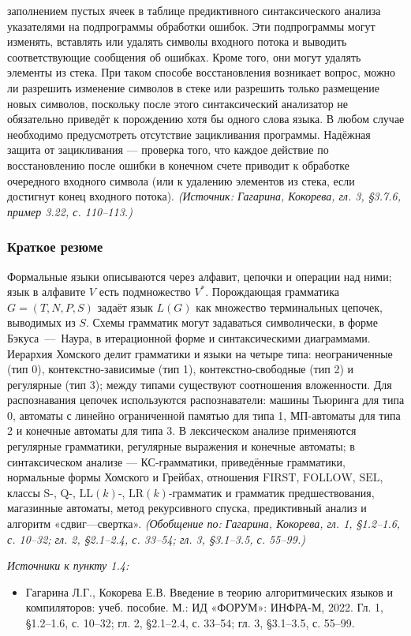 \documentclass[a4paper,12pt]{article}
\begin{document}
заполнением пустых ячеек в таблице предиктивного синтаксического анализа указателями на подпрограммы обработки ошибок. Эти подпрограммы могут изменять, вставлять или удалять символы входного потока и выводить соответствующие сообщения об ошибках. Кроме того, они могут удалять элементы из стека. При таком способе восстановления возникает вопрос, можно ли разрешить изменение символов в стеке или разрешить только размещение новых символов, поскольку после этого синтаксический анализатор не обязательно приведёт к порождению хотя бы одного слова языка. В любом случае необходимо предусмотреть отсутствие зацикливания программы. Надёжная защита от зацикливания — проверка того, что каждое действие по восстановлению после ошибки в конечном счете приводит к обработке очередного входного символа (или к удалению элементов из стека, если достигнут конец входного потока).
\textit{(Источник: Гагарина, Кокорева, гл. 3, §3.7.6, пример 3.22, с. 110--113.)}

\subsubsection{Краткое резюме}

Формальные языки описываются через алфавит, цепочки и операции над ними; язык в алфавите \(V\) есть подмножество \(V^*\). Порождающая грамматика \(G=(T,N,P,S)\) задаёт язык \(L(G)\) как множество терминальных цепочек, выводимых из \(S\). Схемы грамматик могут задаваться символически, в форме Бэкуса~—~Наура, в итерационной форме и синтаксическими диаграммами. Иерархия Хомского делит грамматики и языки на четыре типа: неограниченные (тип 0), контекстно-зависимые (тип 1), контекстно-свободные (тип 2) и регулярные (тип 3); между типами существуют соотношения вложенности. Для распознавания цепочек используются распознаватели: машины Тьюринга для типа 0, автоматы с линейно ограниченной памятью для типа 1, МП-автоматы для типа 2 и конечные автоматы для типа 3. В лексическом анализе применяются регулярные грамматики, регулярные выражения и конечные автоматы; в синтаксическом анализе — КС-грамматики, приведённые грамматики, нормальные формы Хомского и Грейбах, отношения \(\mathrm{FIRST}\), \(\mathrm{FOLLOW}\), \(\mathrm{SEL}\), классы S-, Q-, \(\mathrm{LL}(k)\)-, \(\mathrm{LR}(k)\)-грамматик и грамматик предшествования, магазинные автоматы, метод рекурсивного спуска, предиктивный анализ и алгоритм «сдвиг—свертка».
\textit{(Обобщение по: Гагарина, Кокорева, гл. 1, §1.2--1.6, с. 10--32; гл. 2, §2.1--2.4, с. 33--54; гл. 3, §3.1--3.5, с. 55--99.)}

\noindent\textit{Источники к пункту 1.4:}
\begin{itemize}
\item Гагарина Л.Г., Кокорева Е.В. Введение в теорию алгоритмических языков и компиляторов: учеб. пособие. М.: ИД «ФОРУМ»: ИНФРА-М, 2022. Гл. 1, §1.2--1.6, с. 10--32; гл. 2, §2.1--2.4, с. 33--54; гл. 3, §3.1--3.5, с. 55--99.
\end{itemize}
\end{document}
